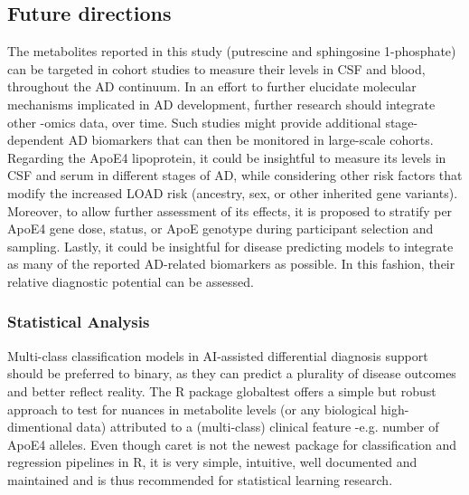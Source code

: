 \documentclass{amsart}
\begin{document}
\subsection{Future directions}
The metabolites reported in this study (putrescine and sphingosine 1-phosphate) can be targeted in cohort studies to measure their levels in CSF and blood, throughout the AD continuum. In an effort to further elucidate molecular mechanisms implicated in AD development, further research should integrate other -omics data, over time. Such studies might provide additional stage-dependent AD biomarkers that can then be monitored in large-scale cohorts. Regarding the ApoE4 lipoprotein, it could be insightful to measure its levels in CSF and serum in different stages of AD, while considering other risk factors that modify the increased LOAD risk (ancestry, sex, or other inherited gene variants). Moreover, to allow further assessment of its effects, it is proposed to stratify per ApoE4 gene dose, status, or ApoE genotype during participant selection and sampling. Lastly, it could be insightful for disease predicting models to integrate as many of the reported AD-related biomarkers as possible. In this fashion, their relative diagnostic potential can be assessed.

\subsubsection{Statistical Analysis}Multi-class classification models in AI-assisted differential diagnosis support should be preferred to binary, as they can predict a plurality of disease outcomes and better reflect reality. The R package \textsf{globaltest} offers a simple but robust approach to test for nuances in metabolite levels (or any biological high-dimentional data) attributed to a (multi-class) clinical feature -e.g. number of ApoE4 alleles. Even though \textsf{caret} is not the newest package for classification and regression pipelines in R, it is very simple, intuitive, well documented and maintained and is thus recommended for statistical learning research.
\clearpage
\end{document}
